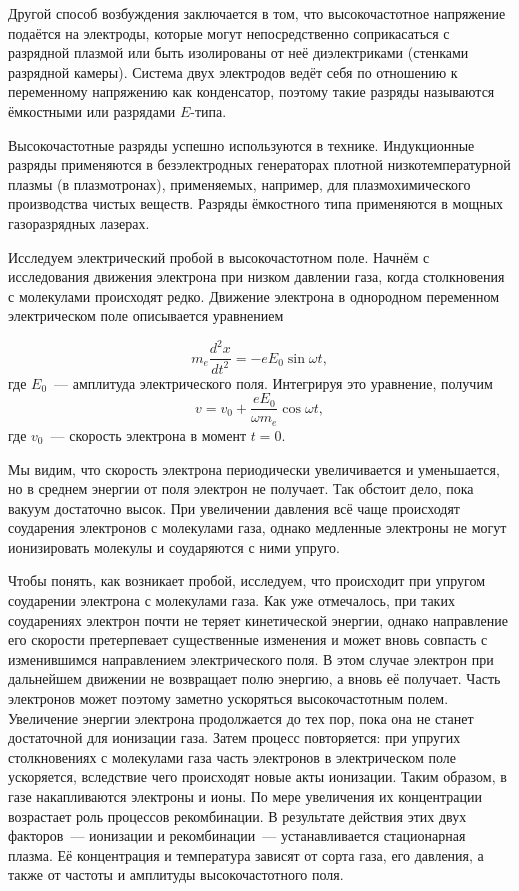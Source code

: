 Другой способ возбуждения заключается в том, что высокочастотное напряжение подаётся на электроды, которые могут
непосредственно соприкасаться с разрядной плазмой или быть изолированы от неё диэлектриками (стенками разрядной камеры).
Система двух электродов ведёт себя по отношению к переменному напряжению как конденсатор, поэтому такие разряды
называются ёмкостными или разрядами $E$-типа.

Высокочастотные разряды успешно используются в технике. Индукционные разряды применяются в безэлектродных генераторах
плотной низкотемпературной плазмы (в плазмотронах), применяемых, например, для плазмохимического производства чистых
веществ. Разряды ёмкостного типа применяются в мощных газоразрядных лазерах.

Исследуем электрический пробой в высокочастотном поле. Начнём с исследования движения электрона при низком давлении
газа, когда столкновения с молекулами происходят редко. Движение электрона в однородном переменном электрическом поле
описывается уравнением

\[
m_e\frac{d^2x}{dt^2}=-eE_0\sin\omega t,
\]
где $E_0$~--- амплитуда электрического поля. Интегрируя это уравнение, получим
\[
v=v_0+\frac{eE_0}{\omega m_e}\cos\omega t,
\]
где $v_0$~--- скорость электрона в момент $t=0$.

Мы видим, что скорость электрона периодически увеличивается и уменьшается, но в среднем энергии от поля электрон не
получает. Так обстоит дело, пока вакуум достаточно высок. При увеличении давления всё чаще происходят соударения
электронов с молекулами газа, однако медленные электроны не могут ионизировать молекулы и соударяются с ними упруго.

Чтобы понять, как возникает пробой, исследуем, что происходит при упругом соударении электрона с молекулами газа. Как
уже отмечалось, при таких соударениях электрон почти не теряет кинетической энергии, однако направление его скорости
претерпевает существенные изменения и может вновь совпасть с изменившимся направлением электрического поля. В этом
случае электрон при дальнейшем движении не возвращает полю энергию, а вновь её получает. Часть электронов может поэтому
заметно ускоряться высокочастотным полем. Увеличение энергии электрона продолжается до тех пор, пока она не станет
достаточной для ионизации газа. Затем процесс повторяется: при упругих столкновениях с молекулами газа часть электронов
в электрическом поле ускоряется, вследствие чего происходят новые акты ионизации. Таким образом, в газе накапливаются
электроны и ионы. По мере увеличения их концентрации возрастает роль процессов рекомбинации. В результате действия этих
двух факторов~--- ионизации и рекомбинации~--- устанавливается стационарная плазма. Её концентрация и температура
зависят от сорта газа, его давления, а также от частоты и амплитуды высокочастотного поля.






